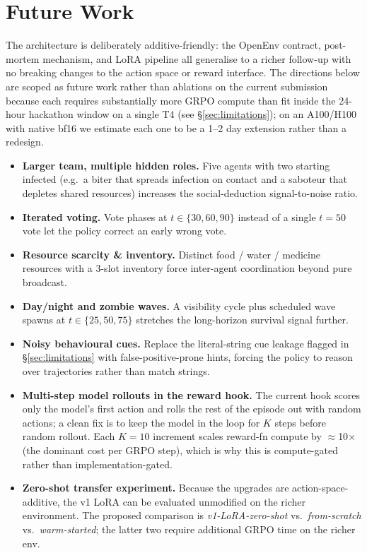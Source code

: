 \documentclass[11pt,a4paper]{article}
\begin{document}
\section{Future Work}
\label{sec:future}

The architecture is deliberately additive-friendly: the OpenEnv contract,
post-mortem mechanism, and LoRA pipeline all generalise to a richer follow-up
with no breaking changes to the action space or reward interface. The
directions below are scoped as future work rather than ablations on the
current submission because each requires substantially more GRPO compute
than fit inside the 24-hour hackathon window on a single T4 (see
§\ref{sec:limitations}); on an A100/H100 with native bf16 we estimate
each one to be a 1--2 day extension rather than a redesign.

\begin{itemize}[leftmargin=*,nosep]
  \item \textbf{Larger team, multiple hidden roles.} Five agents with two
        starting infected (e.g.\ a biter that spreads infection on contact
        and a saboteur that depletes shared resources) increases the
        social-deduction signal-to-noise ratio.
  \item \textbf{Iterated voting.} Vote phases at $t\in\{30,60,90\}$ instead
        of a single $t{=}50$ vote let the policy correct an early wrong vote.
  \item \textbf{Resource scarcity \& inventory.} Distinct food / water /
        medicine resources with a 3-slot inventory force inter-agent
        coordination beyond pure broadcast.
  \item \textbf{Day/night and zombie waves.} A visibility cycle plus
        scheduled wave spawns at $t\in\{25,50,75\}$ stretches the
        long-horizon survival signal further.
  \item \textbf{Noisy behavioural cues.} Replace the literal-string cue
        leakage flagged in §\ref{sec:limitations} with false-positive-prone
        hints, forcing the policy to reason over trajectories rather than
        match strings.
  \item \textbf{Multi-step model rollouts in the reward hook.} The current
        hook scores only the model's first action and rolls the rest of the
        episode out with random actions; a clean fix is to keep the model in
        the loop for $K$ steps before random rollout. Each
        $K{=}10$ increment scales reward-fn compute by $\approx$10$\times$
        (the dominant cost per GRPO step), which is why this is
        compute-gated rather than implementation-gated.
  \item \textbf{Zero-shot transfer experiment.} Because the upgrades are
        action-space-additive, the v1 LoRA can be evaluated unmodified on
        the richer environment. The proposed comparison is
        \emph{v1-LoRA-zero-shot} vs.\ \emph{from-scratch} vs.\
        \emph{warm-started}; the latter two require additional GRPO time
        on the richer env.
\end{itemize}
\end{document}
